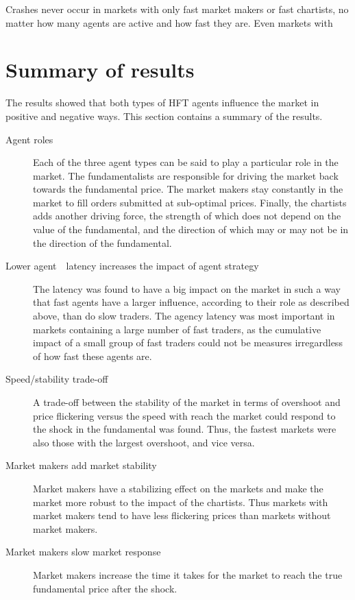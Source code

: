 Crashes never occur in markets with only fast market makers or fast chartists, no matter how many agents are active and how fast they are. Even markets with 
 



\section{Summary of results}
The results showed that both types of HFT agents influence the market in positive and negative ways. This section contains a summary of the results.


\begin{description}
\item[Agent roles] Each of the three agent types can be said to play a particular role in the market. The fundamentalists are responsible for driving the market back towards the fundamental price. The market makers stay constantly in the market to fill orders submitted at sub-optimal prices. Finally, the chartists adds another driving force, the strength of which does not depend on the value of the fundamental, and the direction of which may or may not be in the direction of the fundamental.
\item[Lower agent　latency increases the impact of agent strategy] The latency was found to have a big impact on the market in such a way that fast agents have a larger influence, according to their role as described above, than do slow traders. The agency latency was most important in markets containing a large number of fast traders, as the cumulative impact of a small group of fast traders could not be measures irregardless of how fast these agents are.
\item[Speed/stability trade-off] A trade-off between the stability of the market in terms of overshoot and price flickering versus the speed with reach the market could respond to the shock in the fundamental was found. Thus, the fastest markets were also those with the largest overshoot, and vice versa.

\item[Market makers add market stability] Market makers have a stabilizing effect on the markets and make the market more robust to the impact of the chartists. Thus markets with market makers tend to have less flickering prices than markets without market makers. 
\item[Market makers slow market response] Market makers increase the time it takes for the market to reach the true fundamental price after the shock. 


\end{description}
